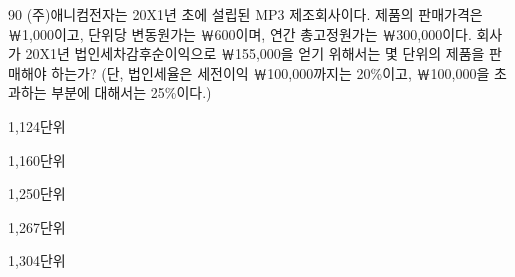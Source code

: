 \begin{question}{90}
(주)애니컴전자는 20X1년 초에 설립된 MP3 제조회사이다. 제품의 판매가격은 ￦1,000이고, 단위당 변동원가는 ￦600이며, 연간 총고정원가는 ￦300,000이다. 회사가 20X1년 법인세차감후순이익으로 ￦155,000을 얻기 위해서는 몇 단위의 제품을 판매해야 하는가? (단, 법인세율은 세전이익 ￦100,000까지는 20\%이고, ￦100,000을 초과하는 부분에 대해서는 25\%이다.)
\begin{choices}
  \item 1,124단위
  \item 1,160단위
  \item 1,250단위
  \item 1,267단위
  \item 1,304단위
\end{choices}
\end{question}
